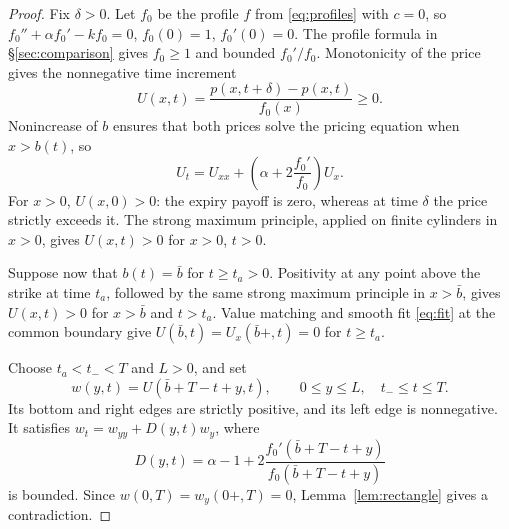 \documentclass[11pt]{article}
\begin{document}
\begin{proof}
Fix $\delta>0$. Let $f_0$ be the profile $f$ from
\eqref{eq:profiles} with $c=0$, so
$f_0''+\alpha f_0'-kf_0=0$, $f_0(0)=1$, $f_0'(0)=0$.
The profile formula in \S\ref{sec:comparison} gives $f_0\ge1$ and
bounded $f_0'/f_0$. Monotonicity of the price gives the nonnegative time increment
\[
  U(x,t)=\frac{p(x,t+\delta)-p(x,t)}{f_0(x)}\ge0.
\]
Nonincrease of $b$ ensures that both prices solve the pricing equation
when $x>b(t)$, so
\[
  U_t=U_{xx}+\left(\alpha+2\frac{f_0'}{f_0}\right)U_x.
\]
For $x>0$, $U(x,0)>0$: the expiry payoff is zero, whereas at time
$\delta$ the price strictly exceeds it. The strong maximum principle,
applied on finite cylinders in $x>0$, gives $U(x,t)>0$ for $x>0$,
$t>0$.

Suppose now that $b(t)=\bar b$ for $t\ge t_a>0$. Positivity at any
point above the strike at time $t_a$, followed by the same strong
maximum principle in $x>\bar b$, gives
$U(x,t)>0$ for $x>\bar b$ and $t>t_a$.
Value matching and smooth fit \eqref{eq:fit} at the common boundary give
$U(\bar b,t)=U_x(\bar b+,t)=0$ for $t\ge t_a$.

Choose $t_a<t_-<T$ and $L>0$, and set
\[
  w(y,t)=U(\bar b+T-t+y,t),\qquad
  0\le y\le L,\quad t_-\le t\le T.
\]
Its bottom and right edges are strictly positive, and its left edge
is nonnegative. It satisfies $w_t=w_{yy}+D(y,t)w_y$, where
\[
  D(y,t)=\alpha-1+
    2\frac{f_0'(\bar b+T-t+y)}{f_0(\bar b+T-t+y)}
\]
is bounded. Since $w(0,T)=w_y(0+,T)=0$,
Lemma~\ref{lem:rectangle} gives a contradiction.
\end{proof}
\end{document}
